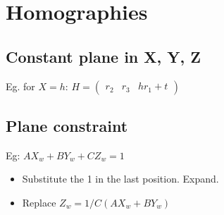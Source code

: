 \section{Homographies}
\subsection*{Constant plane in X, Y, Z}
Eg. for $X = h$:  $H = \begin{pmatrix}
  r_2 & r_3 & h r_1 + t
\end{pmatrix}$ 

\subsection*{Plane constraint}
Eg: $A X_w + B Y_w + C Z_w = 1$
\begin{itemize}
  \item Substitute the 1 in the last position. Expand.
  \item Replace $Z_w = 1/C (A X_w + B Y_w)$
\end{itemize}
